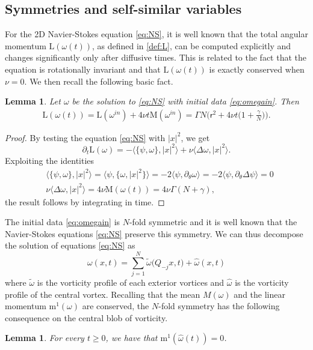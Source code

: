 \documentclass[11pt,reqno,a4paper]{amsart}
\def\de{{\partial}}
\newcommand{\mrm}{\mathrm{m}}
\newcommand{\mrM}{\mathrm{M}}
\newcommand{\1}{\mathbbm{1}}
\newtheorem{lemma}[proposition]{Lemma}
\theoremstyle{definition}
\theoremstyle{definition}
\numberwithin{equation}{section}
\begin{document}
\subsection{Symmetries and self-similar variables}
For the 2D Navier-Stokes equation \cref{eq:NS}, it is well known that the total angular momentum $\mathrm{L}(\omega(t))$, as defined in \cref{def:L}, can be computed explicitly and changes significantly only after diffusive times. This is related to the fact that the equation is rotationally invariant and that $\mathrm{L}(\omega(t))$ is exactly conserved when $\nu=0$. We then recall the following basic fact.
\begin{lemma}
    \label{lem:NSmom} Let $\omega$ be the solution to \cref{eq:NS} with initial data \cref{eq:omegain}. Then
\begin{align}
\label{eq:angmom}
\mathrm{L}(\omega(t))=\mathrm{L}(\omega^{in})+4\nu t\mrM(\omega^{in})=\Gamma N\big(\mathsf{r}^2+4\nu t \big(1+\frac{\gamma}{N}\big)\big).
\end{align}
\end{lemma}
\begin{proof}
By testing the equation \cref{eq:NS} with $|x|^2$, we get
\begin{equation}
    \de_t \mathrm{L}(\omega)=-\langle\{\psi,\omega\},|x|^2\rangle+\nu \langle \Delta \omega,|x|^2\rangle. 
\end{equation}
Exploiting the identities
\begin{align}
    &\langle \{\psi,\omega\},|x|^2\rangle=\langle\psi,\{\omega,|x|^2\}\rangle=-2\langle \psi,\de_\theta \omega\rangle=-2\langle \psi,\de_\theta \Delta\psi\rangle=0\\
    &\nu \langle \Delta\omega,|x|^2\rangle=4\nu\mrM(\omega(t))=4\nu\Gamma (N+\gamma),
\end{align}
the result follows by integrating in time.
\end{proof}
The initial data \cref{eq:omegain} is $N$-fold symmetric and it is well known that the Navier-Stokes equations \cref{eq:NS} preserve this symmetry. 
We can thus decompose the solution of equations \cref{eq:NS} as
\begin{equation}
    \omega(x,t)= \sum_{j=1}^N \tilde{\omega}\big(Q_{-j}x,t) + \widehat{\omega}(x,t)
\end{equation}
where $\tilde{\omega}$ is the vorticity profile of each exterior vortices and $\widehat{\omega}$ is the vorticity profile of the central vortex.
Recalling that the mean $M(\omega)$ and the linear momentum $\mrm^1(\omega)$ are conserved, the $N$-fold symmetry has the following consequence on the central blob of vorticity.
\begin{lemma}\label{lem:centre0}
    For every $t\ge 0$, we have that $\mrm^1(\widehat{\omega}(t)) = 0$.
\end{lemma}
\end{document}
